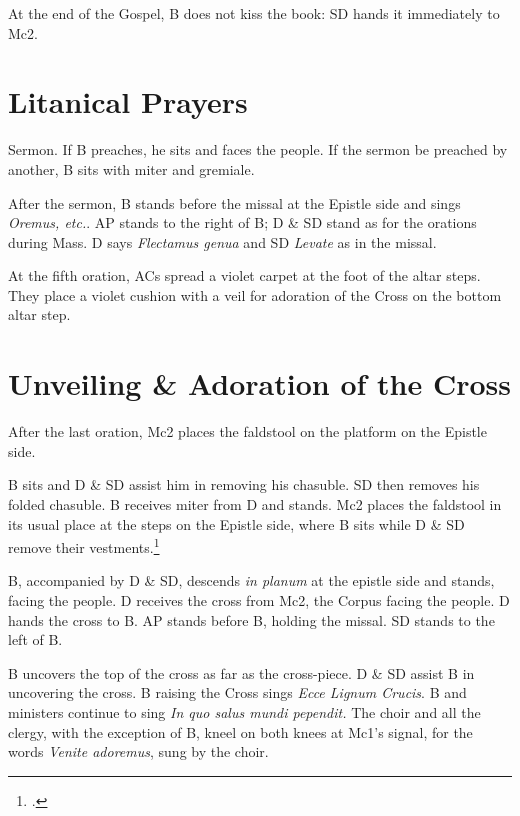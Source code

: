 {\rubric At the end of the Gospel, B does not kiss the book: SD hands it
immediately to Mc2.


\section{Litanical Prayers}

\rubric Sermon. If B preaches, he sits and faces the people. If the sermon be
preached by another, B sits with miter and gremiale.

\rubric After the sermon, B stands before the missal at the Epistle side and
sings \textit{Oremus, etc.}. AP stands to the right of B; D \& SD stand as for
the orations during Mass. D says \textit{Flectamus genua} and SD
\textit{Levate} as in the missal.

\rubric At the fifth oration, ACs spread a violet carpet at the foot of the
altar steps. They place a violet cushion with a veil for adoration of the Cross
on the bottom altar step.

\section{Unveiling \& Adoration of the Cross}

\rubric After the last oration, Mc2 places the faldstool on the platform on the
Epistle side.

\rubric B sits and D \& SD assist him in removing his chasuble. SD then removes
his folded chasuble. B receives miter from D and stands. Mc2 places the
faldstool in its usual place at the steps on the Epistle side, where B sits
while D \& SD remove their vestments.\footcite[][]{sterkyFP:2}

\rubric B, accompanied by D \& SD, descends \textit{in planum} at the epistle
side and stands, facing the people. D receives the cross from Mc2, the Corpus
facing the people. D hands the cross to B. AP stands before B, holding the
missal. SD stands to the left of B.

\rubric B uncovers the top of the cross as far as the cross-piece. D \& SD
assist B in uncovering the cross. B raising the Cross sings \textit{Ecce Lignum
Crucis}. B and ministers continue to sing \textit{In quo salus mundi pependit.}
The choir and all the clergy, with the exception of B, kneel on both knees at
Mc1's signal, for the words \textit{Venite adoremus}, sung by the choir.

}
